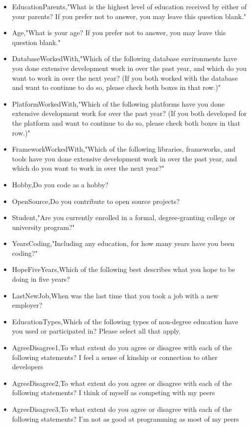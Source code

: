 \begin{appendices}
\begin{itemize}
        \item EducationParents,"What is the highest level of education received by either of your parents? If you prefer not to answer, you may leave this question blank."
        \item Age,"What is your age? If you prefer not to answer, you may leave this question blank."
        \item DatabaseWorkedWith,"Which of the following database environments have you done extensive development work in over the past year, and which do you want to work in over the next year?   (If you both worked with the database and want to continue to do so, please check both boxes in that row.)"
        \item PlatformWorkedWith,"Which of the following platforms have you done extensive development work for over the past year?   (If you both developed for the platform and want to continue to do so, please check both boxes in that row.)"
        \item FrameworkWorkedWith,"Which of the following libraries, frameworks, and tools have you done extensive development work in over the past year, and which do you want to work in over the next year?"
        \item Hobby,Do you code as a hobby?
        \item OpenSource,Do you contribute to open source projects?
        \item Student,"Are you currently enrolled in a formal, degree-granting college or university program?"
        \item YearsCoding,"Including any education, for how many years have you been coding?"
        \item HopeFiveYears,Which of the following best describes what you hope to be doing in five years?
        \item LastNewJob,When was the last time that you took a job with a new employer?
        \item EducationTypes,Which of the following types of non-degree education have you used or participated in? Please select all that apply.
        \item AgreeDisagree1,To what extent do you agree or disagree with each of the following statements? I feel a sense of kinship or connection to other developers
        \item AgreeDisagree2,To what extent do you agree or disagree with each of the following statements? I think of myself as competing with my peers
        \item AgreeDisagree3,To what extent do you agree or disagree with each of the following statements? I'm not as good at programming as most of my peers

\end{itemize}
\end{appendices}
